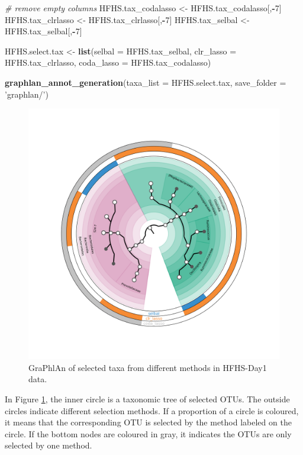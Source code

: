 \documentclass[openany]{book}
\newenvironment{Shaded}{\begin{snugshade}}{\end{snugshade}}
\newcommand{\KeywordTok}[1]{\textcolor[rgb]{0.13,0.29,0.53}{\textbf{#1}}}
\newcommand{\DataTypeTok}[1]{\textcolor[rgb]{0.13,0.29,0.53}{#1}}
\newcommand{\DecValTok}[1]{\textcolor[rgb]{0.00,0.00,0.81}{#1}}
\newcommand{\StringTok}[1]{\textcolor[rgb]{0.31,0.60,0.02}{#1}}
\newcommand{\CommentTok}[1]{\textcolor[rgb]{0.56,0.35,0.01}{\textit{#1}}}
\newcommand{\OperatorTok}[1]{\textcolor[rgb]{0.81,0.36,0.00}{\textbf{#1}}}
\newcommand{\NormalTok}[1]{#1}
\begin{document}
\begin{Shaded}
\begin{Highlighting}[]
\CommentTok{# remove empty columns}
\NormalTok{HFHS.tax_codalasso <-}\StringTok{ }\NormalTok{HFHS.tax_codalasso[,}\OperatorTok{-}\DecValTok{7}\NormalTok{] }
\NormalTok{HFHS.tax_clrlasso <-}\StringTok{ }\NormalTok{HFHS.tax_clrlasso[,}\OperatorTok{-}\DecValTok{7}\NormalTok{]}
\NormalTok{HFHS.tax_selbal <-}\StringTok{ }\NormalTok{HFHS.tax_selbal[,}\OperatorTok{-}\DecValTok{7}\NormalTok{]}

\NormalTok{HFHS.select.tax <-}\StringTok{ }\KeywordTok{list}\NormalTok{(}\DataTypeTok{selbal =}\NormalTok{ HFHS.tax_selbal,}
                        \DataTypeTok{clr_lasso =}\NormalTok{ HFHS.tax_clrlasso,}
                        \DataTypeTok{coda_lasso =}\NormalTok{ HFHS.tax_codalasso)}

\KeywordTok{graphlan_annot_generation}\NormalTok{(}\DataTypeTok{taxa_list =}\NormalTok{ HFHS.select.tax, }\DataTypeTok{save_folder =} \StringTok{'graphlan/'}\NormalTok{)}
\end{Highlighting}
\end{Shaded}

\begin{figure}

{\centering \includegraphics[width=1\linewidth]{./graphlan/taxa} 

}

\caption{GraPhlAn of selected taxa from different methods in HFHS-Day1 data.}\label{fig:graphlanHFHS}
\end{figure}

In Figure \ref{fig:graphlanHFHS}, the inner circle is a taxonomic tree
of selected OTUs. The outside circles indicate different selection
methods. If a proportion of a circle is coloured, it means that the
corresponding OTU is selected by the method labeled on the circle. If
the bottom nodes are coloured in gray, it indicates the OTUs are only
selected by one method.


\end{document}
